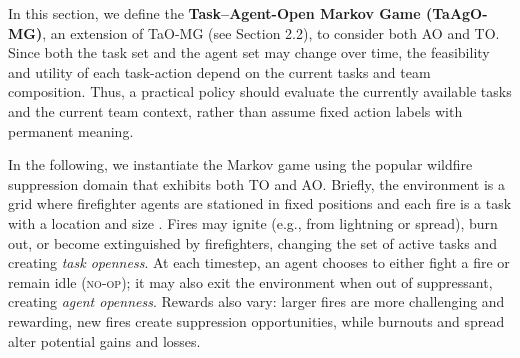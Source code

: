 In this section, we define the \textbf{Task–Agent-Open Markov Game (TaAgO-MG)}, an extension of TaO-MG (see Section 2.2), to consider both AO and TO.  Since both the task set and the agent set may change over time, the feasibility and utility of each task-action depend on the current tasks and team composition. Thus, a practical policy should evaluate the currently available tasks and the current team context, rather than assume fixed action labels with permanent meaning. 

In the following, we instantiate the Markov game using the popular wildfire suppression domain \cite{Chandrasekaran,Kakarlapudi22,anilmohito,eck2020scalable,patino2025inaugural} that exhibits both TO and AO.  Briefly,  the environment is a grid where firefighter agents are stationed in fixed positions and each fire is a task with a location and size \cite{patino2025inaugural}. Fires may ignite (e.g., from lightning or spread), burn out, or become extinguished by firefighters, changing the set of active tasks and creating \emph{task openness}. At each timestep, an agent chooses to either fight a fire or remain idle (\textsc{no-op}); it may also exit the environment when out of suppressant, creating \emph{agent openness}. Rewards also vary: larger fires are more challenging and rewarding, new fires create suppression opportunities, while burnouts and spread alter potential gains and losses.





